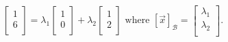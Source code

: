 \documentclass{report}
\begin{document}
  \[
  
    \begin{bmatrix}
    1\\
    6\\
    \end{bmatrix}
    = \lambda_1 \begin{bmatrix}
    1\\
    0\\
    \end{bmatrix}
    + \lambda_2 \begin{bmatrix}
    1\\
    2\\
    \end{bmatrix}
     \text{ where } \left[ \vec{ x}  \right]_{ \mathcal{B}} = \begin{bmatrix}
     \lambda_1\\
     \lambda_2\\
     \end{bmatrix}
  .\] 
\end{document}
